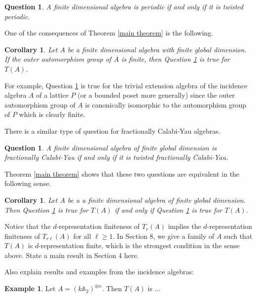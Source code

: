 \documentclass[a4paper,reqno,11pt]{amsart}
\newtheorem{corollary}[theorem]{Corollary}
\newtheorem{question}[theorem]{Question}
\theoremstyle{definition}
\newtheorem{example}[theorem]{Example}
\renewcommand{\comment}[1]{{\color{green!50!gray} #1}}
\numberwithin{equation}{section}
\begin{document}
\begin{question}\label{conj:periodicity}
\cite{ES} A finite dimensional algebra is periodic if and only if it is twisted periodic.
\end{question}

One of the consequences of Theorem \ref{main theorem} is the following.

\begin{corollary}
Let $A$ be a finite dimensional algebra with finite global dimension. If the outer automorphism group of $A$ is finite, then Question \ref{conj:periodicity} is true for $T(A)$.
\end{corollary}

For example, Question \ref{conj:periodicity} is true for the trivial extension algebra of the incidence algebra $A$ of a lattice $P$ (or a bounded poset more generally) since the outer automorphism group of $A$ is canonically isomorphic to the automorphism group of $P$ which is clearly finite.

There is a similar type of question for fractionally Calabi-Yau algebras.

\begin{question}\cite{HerIya}\label{remove twist 2}
A finite dimensional algebra of finite global dimension is fractionally Calabi-Yau if and only if it is twisted fractionally Calabi-Yau.
\end{question}

Theorem \ref{main theorem} shows that these two questions are equivalent in the following sense.

\begin{corollary}
Let $A$ be a a finite dimensional algebra of finite global dimension. Then Question \ref{conj:periodicity} is true for $T(A)$ if and only if Question \ref{remove twist 2} is true for $T(A)$.\end{corollary}






Notice that the $d$-representation finiteness of $T_r(A)$ implies the $d$-representation finiteness of $T_{r\ell}(A)$ for all $\ell\ge1$. In Section 8, we give a family of $A$ such that $T(A)$ is $d$-representation finite, which is the strongest condition in the sense above. \comment{State a main result in Section 4 here.}

\comment{Also explain results and examples from the incidence algebras:}

\begin{example}
Let $A=(k\mathbb{A}_2)^{\otimes n}$. Then $T(A)$ is ...
\end{example}
\end{document}
